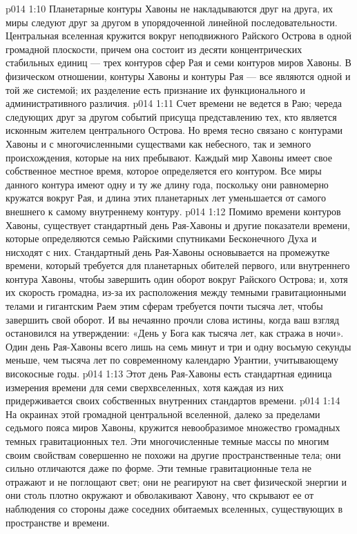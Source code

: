 \vs p014 1:10 Планетарные контуры Хавоны не накладываются друг на друга, их миры следуют друг за другом в упорядоченной линейной последовательности. Центральная вселенная кружится вокруг неподвижного Райского Острова в одной громадной плоскости, причем она состоит из десяти концентрических стабильных единиц --- трех контуров сфер Рая и семи контуров миров Хавоны. В физическом отношении, контуры Хавоны и контуры Рая --- все являются одной и той же системой; их разделение есть признание их функционального и административного различия.
\vs p014 1:11 \pc Счет времени не ведется в Раю; череда следующих друг за другом событий присуща представлению тех, кто является исконным жителем центрального Острова. Но время тесно связано с контурами Хавоны и с многочисленными существами как небесного, так и земного происхождения, которые на них пребывают. Каждый мир Хавоны имеет свое собственное местное время, которое определяется его контуром. Все миры данного контура имеют одну и ту же длину года, поскольку они равномерно кружатся вокруг Рая, и длина этих планетарных лет уменьшается от самого внешнего к самому внутреннему контуру.
\vs p014 1:12 Помимо времени контуров Хавоны, существует стандартный день Рая\hyp{}Хавоны и другие показатели времени, которые определяются семью Райскими спутниками Бесконечного Духа и нисходят с них. Стандартный день Рая\hyp{}Хавоны основывается на промежутке времени, который требуется для планетарных обителей первого, или внутреннего контура Хавоны, чтобы завершить один оборот вокруг Райского Острова; и, хотя их скорость громадна, из\hyp{}за их расположения между темными гравитационными телами и гигантским Раем этим сферам требуется почти тысяча лет, чтобы завершить свой оборот. И вы нечаянно прочли слова истины, когда ваш взгляд остановился на утверждении: «День у Бога как тысяча лет, как стража в ночи». Один день Рая\hyp{}Хавоны всего лишь на семь минут и три и одну восьмую секунды меньше, чем тысяча лет по современному календарю Урантии, учитывающему високосные годы.
\vs p014 1:13 Этот день Рая\hyp{}Хавоны есть стандартная единица измерения времени для семи сверхвселенных, хотя каждая из них придерживается своих собственных внутренних стандартов времени.
\vs p014 1:14 \pc На окраинах этой громадной центральной вселенной, далеко за пределами седьмого пояса миров Хавоны, кружится невообразимое множество громадных темных гравитационных тел. Эти многочисленные темные массы по многим своим свойствам совершенно не похожи на другие пространственные тела; они сильно отличаются даже по форме. Эти темные гравитационные тела не отражают и не поглощают свет; они не реагируют на свет физической энергии и они столь плотно окружают и обволакивают Хавону, что скрывают ее от наблюдения со стороны даже соседних обитаемых вселенных, существующих в пространстве и времени.

